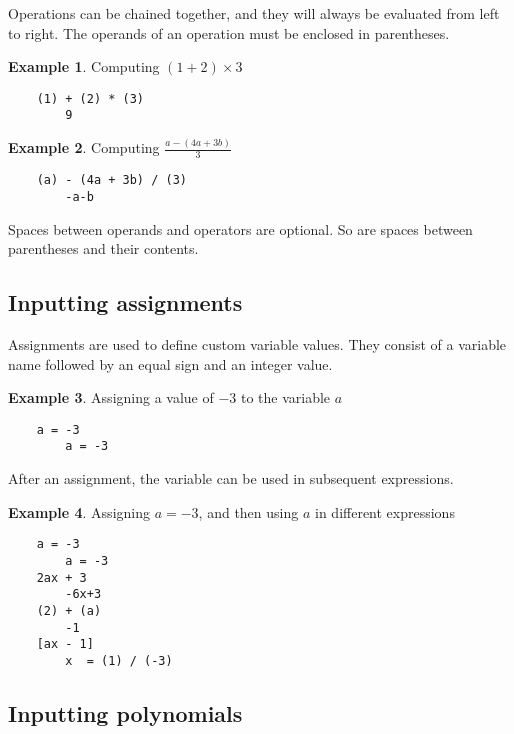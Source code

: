 Operations can be chained together, and they will always be evaluated from left to right. The operands of an operation must be enclosed in parentheses.

\theoremstyle{definition}
\newtheorem{exmp}{Example}[section]

\begin{exmp}{Computing $(1 + 2) \times 3$}
    \begin{verbatim}
    (1) + (2) * (3)
        9
    \end{verbatim}
\end{exmp}

\begin{exmp}{Computing $\frac{a - \left(4a + 3b\right)}{3}$}
    \begin{verbatim}
    (a) - (4a + 3b) / (3)   
        -a-b
    \end{verbatim}
\end{exmp}

Spaces between operands and operators are optional. So are spaces between parentheses and their contents.

\subsection{Inputting assignments}

Assignments are used to define custom variable values. They consist of a variable name followed by an equal sign and an integer value.

\begin{exmp}{Assigning a value of $-3$ to the variable $a$}
    \begin{verbatim}
    a = -3
        a = -3
    \end{verbatim}
\end{exmp}

After an assignment, the variable can be used in subsequent expressions.

\begin{exmp}
    {Assigning $a=-3$, and then using $a$ in different expressions}
    \begin{verbatim}
    a = -3
        a = -3
    2ax + 3
        -6x+3
    (2) + (a)
        -1
    [ax - 1]
        x  = (1) / (-3)
    \end{verbatim}
\end{exmp}

\subsection{Inputting polynomials}

